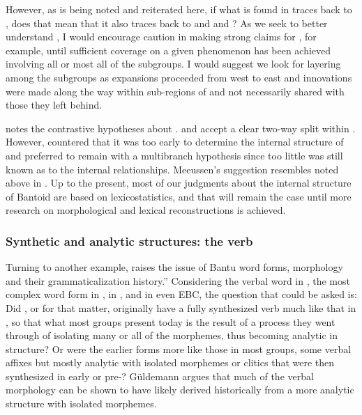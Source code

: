 \documentclass[output=paper]{langsci/langscibook}
\begin{document}
However, as is being noted and reiterated here, if what is found in  traces back to , does that mean that it also traces back to  and  and ? As we seek to better understand , I would encourage caution in making strong claims for , for example, until sufficient coverage on a given phenomenon has been achieved involving all or most all of the  subgroups. I would suggest we look for layering among the  subgroups as expansions proceeded from west to east and innovations were made along the way within sub-regions of  and not necessarily shared with those they left behind. 

\newpage 
\citet[406-407]{Watters1989} notes the contrastive hypotheses about . \citet{Williamson1971} and \citet{Greenberg1974} accept a clear two-way split within . However, \citet{Meeussen1974} countered that it was too early to determine the internal structure of  and preferred to remain with a multibranch hypothesis since too little was still known as to the internal  relationships. Meeussen’s suggestion resembles \citet{Blench2015} noted above in . Up to the present, most of our judgments about the internal structure of Bantoid are based on lexicostatistics, and that will remain the case until more research on morphological and lexical reconstructions is achieved.


\subsubsection{Synthetic and analytic structures: the verb}

Turning to another example, \citet[183--187]{Güldemann2003} raises the issue of {Ban\-tu} word forms, morphology and their grammaticalization history.” Considering the verbal word in , the most complex word form in , in , and in even EBC, the question that could be asked is: Did , or  for that matter, originally have a fully synthesized verb much like that in , so that what most  groups present today is the result of a process they went through of isolating many or all of the morphemes, thus becoming analytic in structure? Or were the earlier forms more like those in most  groups, some verbal affixes but mostly analytic with isolated morphemes or clitics that were then synthesized in early  or pre-? G\"{u}ldemann argues that much of the  verbal morphology can be shown to have likely derived historically from a more analytic structure with isolated morphemes. 
\end{document}
